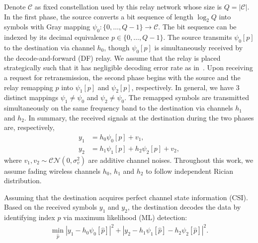 \documentclass[journal]{IEEEtran}
\begin{document}
Denote $\mathcal{C}$ as fixed constellation used by this relay network whose
size is $Q = |\mathcal{C}|$. In the first phase, the source converts a bit
sequence of length $\log_2Q$ into symbols with Gray mapping $\psi_0:
\{0,\ldots,Q - 1\}\rightarrow \mathcal{C}$. The bit sequence can be indexed by
its decimal equivalence $p\in \{0,\ldots,Q - 1\}$. The source transmits
$\psi_0[p]$ to the destination via channel $h_0$, though $\psi_0[p]$ is
simultaneously received by the decode-and-forward (DF) relay. We assume that the
relay is placed strategically such that it has negligible decoding error rate as
in~\cite{ryu2011ber, kim2009design}. Upon receiving a request for
retransmission, the second phase begins with the source and the relay remapping
$p$ into $\psi_1[p]$ and $\psi_2[p]$, respectively. In general, we have 3
distinct mappings $\psi_1\not=\psi_0$ and $\psi_2\not=\psi_0$. The remapped
symbols are transmitted simultaneously on the same frequency band to the
destination via channels $h_1$ and $h_2$. In summary, the received signals at
the destination during the two phases are, respectively,
\begin{subequations}
    \begin{align}
       y_1 & = h_0\psi_0[p] + v_1, \\
       y_2 & = h_1\psi_1[p] + h_2\psi_2[p] + v_2,
    \end{align}
\end{subequations}
where $v_1, v_2\sim\mathcal{CN}(0,\sigma_v^2)$ are additive channel noises.
Throughout this work, we assume fading wireless channels $h_0$, $h_1$ and $h_2$ 
to follow independent Rician distribution.

Assuming that the destination acquires perfect channel state information (CSI).
Based on the received symbols $y_1$ and $y_2$,  the destination decodes the data
by identifying index $p$ via maximum likelihood (ML) detection:
\begin{align}
    \min_{\hat{p}} |y_1 - h_0\psi_0[\hat{p}]|^2 + |y_2-
    h_1\psi_1[\hat{p}] - h_2\psi_2[\hat{p}]|^2.
    \label{eq:ML}
\end{align}

%
%
\end{document}
